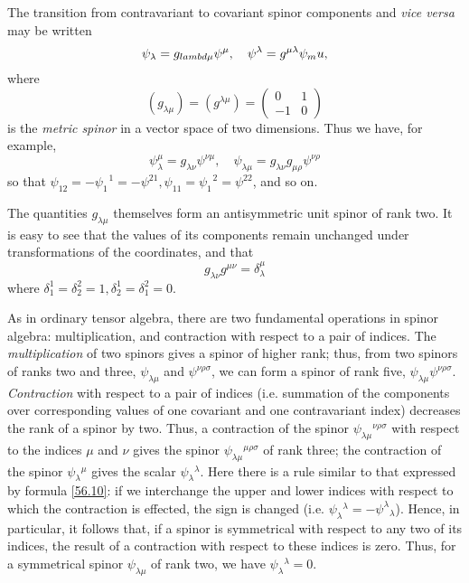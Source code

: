 The transition from contravariant to covariant spinor components and \textit{vice versa} may be written
\begin{equation}\label{56.14}
\psi_\lambda=g_{\\lambd
\mu}\psi^\mu,\quad\psi^\lambda=g^{\mu\lambda}\psi_mu,
\end{equation}
where
\begin{equation}\label{56.15}
\left(g_{\lambda\mu}\right)=\left(g^{\lambda\mu}\right)=\left(\begin{array}{cc}
0&1\\-1&0
\end{array}\right)
\end{equation}
is the \textit{metric spinor} in a vector space of two dimensions. Thus we have, for example,
\[ \psi_\lambda^\mu=g_{\lambda\nu}\psi^{\nu\mu},\quad\psi_{\lambda\mu}=g_{\lambda\nu}g_{\mu\rho}\psi^{\nu\rho} \]
so that $ \psi_{12} = -\psi_1^{\text{ }1} = -\psi^{21}, \psi_{11} = \psi_1^{\text{ }2} = \psi^{22} $, and so on.

The quantities $ g_{\lambda\mu} $ themselves form an antisymmetric unit spinor of rank two. It is easy to see that the values of its components remain unchanged under transformations of the coordinates, and that
\begin{equation}\label{56.16}
g_{\lambda\nu}g^{\mu\nu}=\delta_\lambda^\mu
\end{equation}
where $ \delta_1^1 = \delta_2^2 = 1, \delta_2^1 = \delta_1^2 = 0 $.

As in ordinary tensor algebra, there are two fundamental operations in spinor algebra: multiplication, and contraction with respect to a pair of indices. The \textit{multiplication} of two spinors gives a spinor of higher rank; thus, from two spinors of ranks two and three, $\psi_{\lambda\mu}$ and $ \psi^{\nu\rho\sigma} $, we can form a spinor of rank five, $\psi_{\lambda\mu}\psi^{\nu\rho\sigma}  $. \textit{Contraction} with respect to a pair of indices (i.e. summation of the components over corresponding values of one covariant and one contravariant index) decreases the rank of a spinor by two. Thus, a contraction of the spinor $ \psi_{\lambda\mu}{}^{\nu\rho\sigma} $ with respect to the indices $\mu$ and $\nu$ gives the spinor  $\psi_{\lambda\mu}{}^{\mu\rho\sigma} $ of rank three; the contraction of the spinor $ \psi_\lambda{}^{\mu} $ gives the scalar $ \psi_\lambda{}^{\lambda} $. Here there is a rule similar to that expressed by formula \eqref{56.10}: if we interchange the upper and lower indices with respect to which the contraction is effected, the sign is changed (i.e. $ \psi_\lambda{}^{\lambda}=-\psi^\lambda{}_{\lambda} $). Hence, in particular, it follows that, if a spinor is symmetrical with respect to any two of its indices, the result of a contraction with respect to these indices is zero. Thus, for a symmetrical spinor $ \psi_{\lambda\mu} $ of rank two, we have $ \psi_\lambda{}^\lambda = 0 $.


